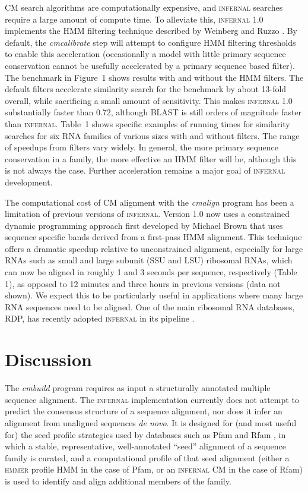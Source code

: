 \documentclass[11pt]{article}
\begin{document}
CM search algorithms are computationally expensive, and
\textsc{infernal} searches require a large amount of compute time.  To
alleviate this, \textsc{infernal} 1.0 implements the HMM filtering
technique described by Weinberg and Ruzzo \citep{WeinbergRuzzo06}. By
default, the \emph{cmcalibrate} step will attempt to configure HMM
filtering thresholds to enable this acceleration (occasionally a model
with little primary sequence conservation cannot be usefully
accelerated by a primary sequence based filter).  The benchmark in
Figure~1 shows results with and without the HMM filters. The default
filters accelerate similarity search for the benchmark by about
13-fold overall, while sacrificing a small amount of sensitivity. This
makes \textsc{infernal} 1.0 substantially faster than 0.72, although
\textsc{BLAST} is still orders of magnitude faster than
\textsc{infernal}. Table~1 shows specific examples of running times
for similarity searches for six RNA families of various sizes with and
without filters. The range of speedups from filters vary widely. In
general, the more primary sequence conservation in a family, the more
effective an HMM filter will be, although this is not always the
case. Further acceleration remains a major goal of \textsc{infernal}
development.

The computational cost of CM alignment with the \emph{cmalign} program
has been a limitation of previous versions of
\textsc{infernal}. Version 1.0 now uses a constrained dynamic
programming approach first developed by Michael Brown \citep{Brown00}
that uses sequence specific bands derived from a first-pass HMM
alignment. This technique offers a dramatic speedup relative to
unconstrained alignment, especially for large RNAs such as small and
large subunit (SSU and LSU) ribosomal RNAs, which can now be aligned
in roughly 1 and 3 seconds per sequence, respectively (Table 1), as
opposed to 12 minutes and three hours in previous versions (data not
shown). We expect this to be particularly useful in applications where
many large RNA sequences need to be aligned. One of the main ribosomal
RNA databases, RDP, has recently adopted \textsc{infernal} in its
pipeline \citep{Cole09}.


\section{Discussion}

The \emph{cmbuild} program requires as input a structurally annotated
multiple sequence alignment. The \textsc{infernal} implementation
currently does not attempt to predict the consensus structure of a
sequence alignment, nor does it infer an alignment from unaligned
sequences \emph{de novo}. It is designed for (and most useful for) the
seed profile strategies used by databases such as Pfam and Rfam
\citep{Finn08,Gardner09}, in which a stable, representative,
well-annotated ``seed'' alignment of a sequence family is curated, and
a computational profile of that seed alignment (either a
\textsc{hmmer} profile HMM in the case of Pfam, or an
\textsc{infernal} CM in the case of Rfam) is used to identify and
align additional members of the family.
\end{document}
